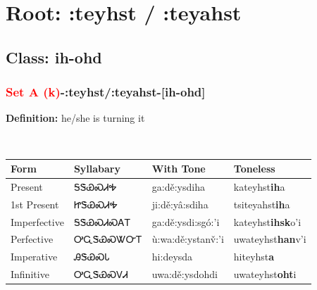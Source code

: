 \needspace{4in}
\section*{Root: :teyhst / :teyahst}
\nopagebreak
{}
\needspace{3in}
\subsection*{Class: ih-ohd}
\nopagebreak
\needspace{2in}
\subsubsection*{\textcolor{Red}{Set A (k)}{-}\textbf{:teyhst/:teyahst}{-}[ih-ohd]}
\nopagebreak
\textbf{Definition: } he/she is turning it
\\[0.5em]
\begin{tabularx}{\textwidth}{l X X X}%
\toprule%
\textbf{Form}&\textbf{Syllabary}&\textbf{With Tone}&\textbf{Toneless}\\%
\midrule%
Present&ᎦᏕᏯᏍᏗᎭ&ga:dě:ysdiha&kateyhst\textbf{ih}a\\%
1st Present&ᏥᏕᏯᏍᏗᎭ&ji:dě:yâ:sdiha&tsiteyahst\textbf{ih}a\\%
Imperfective&ᎦᏕᏯᏍᏗᏍᎪᎢ&ga:dě:ysdi:sgó:’i&kateyhst\textbf{ihsk}o'i\\%
Perfective&ᎤᏩᏕᏯᏍᏔᏅᎢ&ù:wa:dě:ystanv̌:’i&uwateyhst\textbf{han}v'i\\%
Imperative&ᎯᏕᏯᏍᏓ&hi:deysda&hiteyhst\textbf{a}\\%
Infinitive&ᎤᏩᏕᏯᏍᏙᏗ&uwa:dě:ysdohdi&uwateyhst\textbf{oht}i\\%
\bottomrule%
\end{tabularx}
\\[1em]